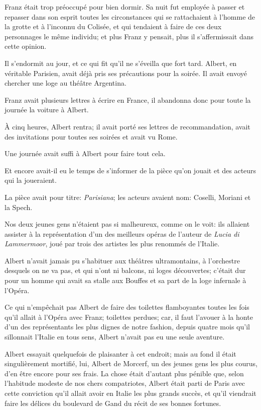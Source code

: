 Franz était trop préoccupé pour bien dormir. Sa nuit fut employée à passer et repasser dans son esprit toutes les circonstances qui se rattachaient à l'homme de la grotte et à l'inconnu du Colisée, et qui tendaient à faire de ces deux personnages le même individu; et plus Franz y pensait, plus il s'affermissait dans cette opinion. 

Il s'endormit au jour, et ce qui fit qu'il ne s'éveilla que fort tard. Albert, en véritable Parisien, avait déjà pris ses précautions pour la soirée. Il avait envoyé chercher une loge au théâtre Argentina.  

Franz avait plusieurs lettres à écrire en France, il abandonna donc pour toute la journée la voiture à Albert. 

À cinq heures, Albert rentra; il avait porté ses lettres de recommandation, avait des invitations pour toutes ses soirées et avait vu Rome. 

Une journée avait suffi à Albert pour faire tout cela. 

Et encore avait-il eu le temps de s'informer de la pièce qu'on jouait et des acteurs qui la joueraient. 

La pièce avait pour titre: \textit{Parisiana}; les acteurs avaient nom: Coselli, Moriani et la Spech.  

Nos deux jeunes gens n'étaient pas si malheureux, comme on le voit: ils allaient assister à la représentation d'un des meilleurs opéras de l'auteur de \textit{Lucia di Lammermoor}, joué par trois des artistes les plus renommés de l'Italie. 

Albert n'avait jamais pu s'habituer aux théâtres ultramontains, à l'orchestre desquels on ne va pas, et qui n'ont ni balcons, ni loges découvertes; c'était dur pour un homme qui avait sa stalle aux Bouffes et sa part de la loge infernale à l'Opéra. 

Ce qui n'empêchait pas Albert de faire des toilettes flamboyantes toutes les fois qu'il allait à l'Opéra avec Franz; toilettes perdues; car, il faut l'avouer à la honte d'un des représentants les plus dignes de notre fashion, depuis quatre mois qu'il sillonnait l'Italie en tous sens, Albert n'avait pas eu une seule aventure. 

Albert essayait quelquefois de plaisanter à cet endroit; mais au fond il était singulièrement mortifié, lui, Albert de Morcerf, un des jeunes gens les plus courus, d'en être encore pour ses frais. La chose était d'autant plus pénible que, selon l'habitude modeste de nos chers compatriotes, Albert était parti de Paris avec cette conviction qu'il allait avoir en Italie les plus grands succès, et qu'il viendrait faire les délices du boulevard de Gand du récit de ses bonnes fortunes. 

